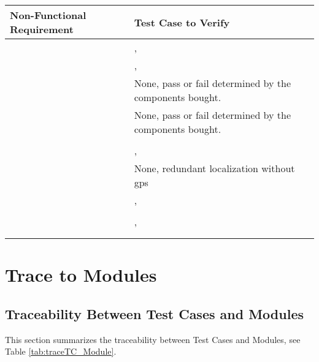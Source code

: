 \documentclass[12pt, titlepage]{article}
\begin{document}
\begin{table}[!h]
\begin{center}
\begin{tabular}{ | m{3cm} | m{12cm} | } 
\hline
Non-Functional Requirement & Test Case to Verify \\
\hline
\nameref{SR_002} & \nameref{tab:STCR_018}, \nameref{tab:UTCR_008} \\ \hline
\nameref{SR_003} & \nameref{tab:STCR_005}, \nameref{tab:STCR_006} \\ \hline
\nameref{SR_004} & None, pass or fail determined by the components bought. \\ \hline
\nameref{SR_005} & None, pass or fail determined by the components bought. \\ \hline
\nameref{SR_006} & \nameref{tab:STCR_018} \\ \hline
\nameref{SR_007} & \nameref{tab:STCR_010}, \nameref{tab:UTCR_016} \\ \hline
\nameref{SR_008} & None, redundant localization without gps \\ \hline
\nameref{SR_009} & \nameref{tab:STCR_015}, \nameref{tab:STCR_014} \\ \hline
\nameref{SR_010} & \nameref{tab:STCR_018} \\ \hline
\nameref{SR_011} & \nameref{tab:STCR_006}, \nameref{tab:UTCR_016} \\ \hline
\nameref{SR_012} & \nameref{tab:STCR_007} \\ \hline
\nameref{SR_013} & \nameref{tab:UTCR_009} \\ \hline
\end{tabular}
\end{center}
\end{table}


\clearpage
		
\section{Trace to Modules}
\subsection{Traceability Between Test Cases and Modules}
This section summarizes the traceability between Test Cases and Modules, see Table \ref{tab:traceTC_Module}. 
\end{document}
